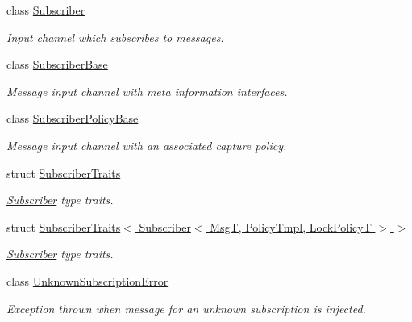 \begin{DoxyCompactItemize}
class \hyperlink{classflow__ros_1_1_subscriber}{Subscriber}
\begin{DoxyCompactList}\small\item\em Input channel which subscribes to messages. \end{DoxyCompactList}\item 
class \hyperlink{classflow__ros_1_1_subscriber_base}{Subscriber\+Base}
\begin{DoxyCompactList}\small\item\em Message input channel with meta information interfaces. \end{DoxyCompactList}\item 
class \hyperlink{classflow__ros_1_1_subscriber_policy_base}{Subscriber\+Policy\+Base}
\begin{DoxyCompactList}\small\item\em Message input channel with an associated capture policy. \end{DoxyCompactList}\item 
struct \hyperlink{structflow__ros_1_1_subscriber_traits}{Subscriber\+Traits}
\begin{DoxyCompactList}\small\item\em \hyperlink{classflow__ros_1_1_subscriber}{Subscriber} type traits. \end{DoxyCompactList}\item 
struct \hyperlink{structflow__ros_1_1_subscriber_traits_3_01_subscriber_3_01_msg_t_00_01_policy_tmpl_00_01_lock_policy_t_01_4_01_4}{Subscriber\+Traits$<$ Subscriber$<$ Msg\+T, Policy\+Tmpl, Lock\+Policy\+T $>$ $>$}
\begin{DoxyCompactList}\small\item\em \hyperlink{classflow__ros_1_1_subscriber}{Subscriber} type traits. \end{DoxyCompactList}\item 
class \hyperlink{classflow__ros_1_1_unknown_subscription_error}{Unknown\+Subscription\+Error}
\begin{DoxyCompactList}\small\item\em Exception thrown when message for an unknown subscription is injected. \end{DoxyCompactList}\end{DoxyCompactItemize}
